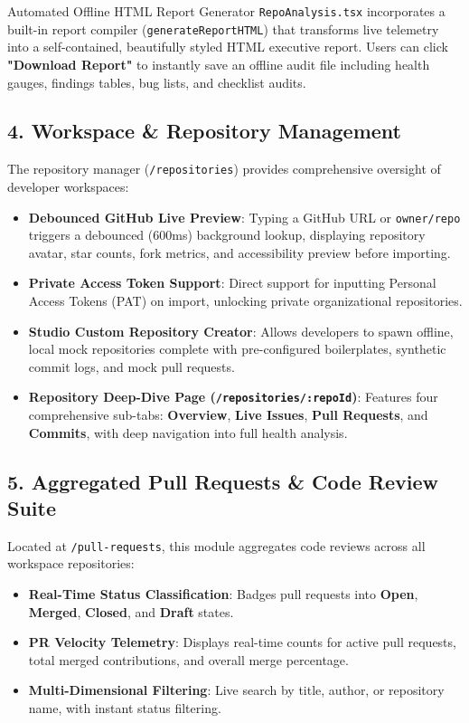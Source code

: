 \documentclass[11pt,a4paper]{article}
\begin{document}
\begin{calloutbox}[secondary]{Automated Offline HTML Report Generator}
\texttt{RepoAnalysis.tsx} incorporates a built-in report compiler (\texttt{generateReportHTML}) that transforms live telemetry into a self-contained, beautifully styled HTML executive report. Users can click \textbf{"Download Report"} to instantly save an offline audit file including health gauges, findings tables, bug lists, and checklist audits.
\end{calloutbox}

\subsection{4. Workspace \& Repository Management}
The repository manager (\texttt{/repositories}) provides comprehensive oversight of developer workspaces:
\begin{itemize}[leftmargin=1.5em]
    \item \textbf{Debounced GitHub Live Preview}: Typing a GitHub URL or \texttt{owner/repo} triggers a debounced (600ms) background lookup, displaying repository avatar, star counts, fork metrics, and accessibility preview before importing.
    \item \textbf{Private Access Token Support}: Direct support for inputting Personal Access Tokens (PAT) on import, unlocking private organizational repositories.
    \item \textbf{Studio Custom Repository Creator}: Allows developers to spawn offline, local mock repositories complete with pre-configured boilerplates, synthetic commit logs, and mock pull requests.
    \item \textbf{Repository Deep-Dive Page (\texttt{/repositories/:repoId})}: Features four comprehensive sub-tabs: \textbf{Overview}, \textbf{Live Issues}, \textbf{Pull Requests}, and \textbf{Commits}, with deep navigation into full health analysis.
\end{itemize}

\subsection{5. Aggregated Pull Requests \& Code Review Suite}
Located at \texttt{/pull-requests}, this module aggregates code reviews across all workspace repositories:
\begin{itemize}[leftmargin=1.5em]
    \item \textbf{Real-Time Status Classification}: Badges pull requests into \textbf{Open}, \textbf{Merged}, \textbf{Closed}, and \textbf{Draft} states.
    \item \textbf{PR Velocity Telemetry}: Displays real-time counts for active pull requests, total merged contributions, and overall merge percentage.
    \item \textbf{Multi-Dimensional Filtering}: Live search by title, author, or repository name, with instant status filtering.
\end{itemize}
\end{document}

